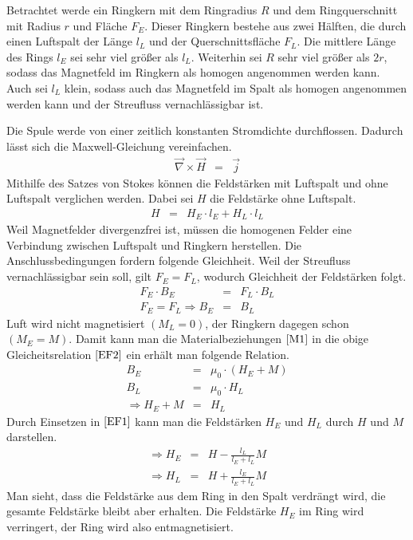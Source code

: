\documentclass[12pt,a4paper]{scrartcl}
\numberwithin{equation}{section} %
\renewcommand{\[}{} %
\renewcommand{\]}{\noindent} %
\begin{document}
Betrachtet werde ein Ringkern mit dem Ringradius \(R\) und dem
Ringquerschnitt mit Radius \(r\) und Fläche \(F_E\). Dieser Ringkern
bestehe aus zwei Hälften, die durch einen Luftspalt der Länge \(l_L\)
und der Querschnittsfläche \(F_L\). Die mittlere Länge des Rings \(l_E\)
sei sehr viel größer als \(l_L\). Weiterhin sei \(R\) sehr viel größer
als \(2r\), sodass das Magnetfeld im Ringkern als homogen angenommen
werden kann. Auch sei \(l_L\) klein, sodass auch das Magnetfeld im Spalt
als homogen angenommen werden kann und der Streufluss vernachlässigbar
ist.

Die Spule werde von einer zeitlich konstanten Stromdichte durchflossen.
Dadurch lässt sich die Maxwell-Gleichung vereinfachen. \[
\begin{eqnarray}
    \vec \nabla \times \vec H &=& \vec j
\end{eqnarray}
\] Mithilfe des Satzes von Stokes können die Feldstärken mit Luftspalt
und ohne Luftspalt verglichen werden. Dabei sei \(H\) die Feldstärke
ohne Luftspalt. \[
\begin{eqnarray}
    H &=& H_E\cdot l_E + H_L \cdot l_L \label{EF1}
\end{eqnarray}
\] Weil Magnetfelder divergenzfrei ist, müssen die homogenen Felder eine
Verbindung zwischen Luftspalt und Ringkern herstellen. Die
Anschlussbedingungen fordern folgende Gleichheit. Weil der Streufluss
vernachlässigbar sein soll, gilt \(F_E = F_L\), wodurch Gleichheit der
Feldstärken folgt. \[
\begin{eqnarray}
    F_E\cdot B_E &=& F_L\cdot B_L \nonumber \\
    F_E = F_L \Rightarrow B_E &=& B_L \label{EF2}
\end{eqnarray}
\] Luft wird nicht magnetisiert \((M_L=0)\), der Ringkern dagegen schon
\((M_E=M)\). Damit kann man die Materialbeziehungen \(\eqref{M1}\) in
die obige Gleicheitsrelation \(\eqref{EF2}\) ein erhält man folgende
Relation. \[
\begin{eqnarray}
    B_E &=& \mu_0 \cdot \left(H_E + M\right) \nonumber \\
    B_L &=& \mu_0 \cdot H_L \nonumber \\
    \Rightarrow H_E + M &=& H_L \label{EF3}
\end{eqnarray}
\] Durch Einsetzen in \(\eqref{EF1}\) kann man die Feldstärken \(H_E\)
und \(H_L\) durch \(H\) und \(M\) darstellen. \[
\begin{eqnarray}
    \Rightarrow H_E &=& H - \frac{l_L}{l_E+l_L} M \\
    \Rightarrow H_L &=& H + \frac{l_E}{l_E+l_L} M
\end{eqnarray}
\] Man sieht, dass die Feldstärke aus dem Ring in den Spalt verdrängt
wird, die gesamte Feldstärke bleibt aber erhalten. Die Feldstärke
\(H_E\) im Ring wird verringert, der Ring wird also entmagnetisiert.
\end{document}
